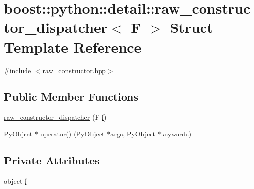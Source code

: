 \hypertarget{structboost_1_1python_1_1detail_1_1raw__constructor__dispatcher}{\section{boost\-:\-:python\-:\-:detail\-:\-:raw\-\_\-constructor\-\_\-dispatcher$<$ F $>$ Struct Template Reference}
\label{structboost_1_1python_1_1detail_1_1raw__constructor__dispatcher}
}


{\ttfamily \#include $<$raw\-\_\-constructor.\-hpp$>$}

\subsection*{Public Member Functions}
\begin{DoxyCompactItemize}
\item 
\hyperlink{structboost_1_1python_1_1detail_1_1raw__constructor__dispatcher_a24c048cfc2d50e1897e6a779eef33f5c}{raw\-\_\-constructor\-\_\-dispatcher} (F \hyperlink{structboost_1_1python_1_1detail_1_1raw__constructor__dispatcher_a055de51d7e8492c050508aa131ec1dd5}{f})
\item 
Py\-Object $\ast$ \hyperlink{structboost_1_1python_1_1detail_1_1raw__constructor__dispatcher_ae3fe9c3c2b28ec59a57468fc05381a96}{operator()} (Py\-Object $\ast$args, Py\-Object $\ast$keywords)
\end{DoxyCompactItemize}
\subsection*{Private Attributes}
\begin{DoxyCompactItemize}
\item 
object \hyperlink{structboost_1_1python_1_1detail_1_1raw__constructor__dispatcher_a055de51d7e8492c050508aa131ec1dd5}{f}
\end{DoxyCompactItemize}


